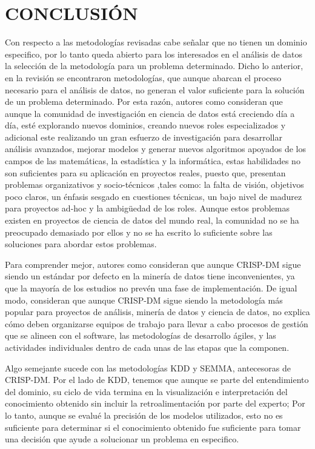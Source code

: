 \section{CONCLUSIÓN}
Con respecto a las metodologías revisadas cabe señalar que no tienen un dominio especifico, por lo tanto queda abierto para los interesados en el análisis de datos la selección de la metodología para un problema determinado. Dicho lo anterior, en la revisión se encontraron metodologías, que aunque abarcan el proceso necesario para el análisis de datos, no generan el valor suficiente para la solución de un problema determinado. Por esta razón, autores como \citep{Martinez2021} consideran que aunque la comunidad de investigación en ciencia de datos está creciendo día a día, esté explorando nuevos dominios, creando nuevos roles especializados y adicional este realizando un gran esfuerzo de investigación para desarrollar análisis avanzados, mejorar modelos y generar nuevos algoritmos apoyados de los campos de las matemáticas, la estadística y la informática, estas habilidades no son suficientes para su aplicación en proyectos reales, puesto que, presentan problemas organizativos y socio-técnicos ,tales como: la falta de visión, objetivos poco claros, un énfasis sesgado en cuestiones técnicas, un bajo nivel de madurez para proyectos ad-hoc y la ambigüedad de los roles. Aunque estos problemas existen en proyectos de ciencia de datos del mundo real, la comunidad no se ha preocupado demasiado por ellos y no se ha escrito lo suficiente sobre las soluciones para abordar estos problemas.

Para comprender mejor, autores como\citep{Schroer2021} consideran que aunque CRISP-DM sigue siendo un estándar por defecto en la minería de datos tiene inconvenientes, ya que la mayoría de los estudios no prevén una fase de implementación. De igual modo, \citep{Martinez2021} consideran que aunque CRISP-DM sigue siendo la metodología más popular para proyectos de análisis, minería de datos y ciencia de datos, no explica cómo deben organizarse equipos de trabajo para llevar a cabo procesos de gestión que se alineen con el software, las metodologías de desarrollo ágiles, y las actividades individuales dentro de cada unas de las etapas que la componen. 

Algo semejante sucede con las metodologías KDD y SEMMA, antecesoras de CRISP-DM. Por el lado de KDD, tenemos que aunque se parte del entendimiento del dominio, su ciclo de vida termina en la visualización e interpretación del conocimiento obtenido sin incluir la retroalimentación por parte del experto; Por lo tanto, aunque se evalué la precisión de los modelos utilizados, esto no es suficiente para determinar si el conocimiento obtenido fue suficiente para tomar una decisión que ayude a solucionar un problema en especifico.   
